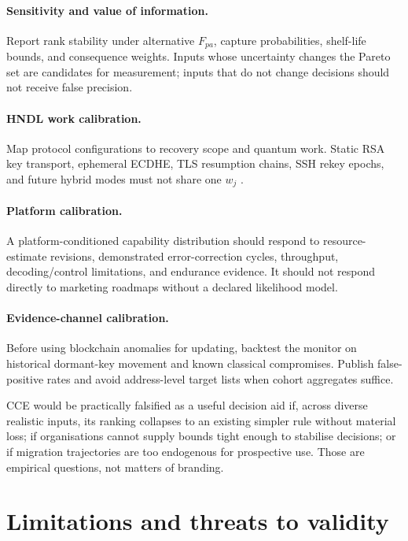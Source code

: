 \documentclass[10pt]{article}
\begin{document}
\paragraph{Sensitivity and value of information.} Report rank stability under alternative $F_{pa}$, capture probabilities, shelf-life bounds, and consequence weights. Inputs whose uncertainty changes the Pareto set are candidates for measurement; inputs that do not change decisions should not receive false precision.

\paragraph{HNDL work calibration.} Map protocol configurations to recovery scope and quantum work. Static RSA key transport, ephemeral ECDHE, TLS resumption chains, SSH rekey epochs, and future hybrid modes must not share one $w_j$ \cite{blanco2026}.

\paragraph{Platform calibration.} A platform-conditioned capability distribution should respond to resource-estimate revisions, demonstrated error-correction cycles, throughput, decoding/control limitations, and endurance evidence. It should not respond directly to marketing roadmaps without a declared likelihood model.

\paragraph{Evidence-channel calibration.} Before using blockchain anomalies for updating, backtest the monitor on historical dormant-key movement and known classical compromises. Publish false-positive rates and avoid address-level target lists when cohort aggregates suffice.

CCE would be practically falsified as a useful decision aid if, across diverse realistic inputs, its ranking collapses to an existing simpler rule without material loss; if organisations cannot supply bounds tight enough to stabilise decisions; or if migration trajectories are too endogenous for prospective use. Those are empirical questions, not matters of branding.

\section{Limitations and threats to validity}
\end{document}
